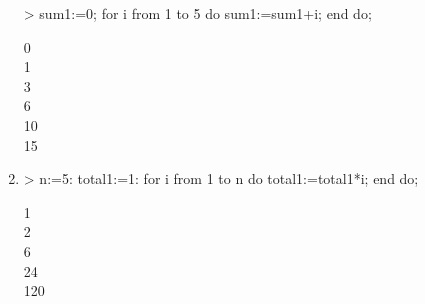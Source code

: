 \begin{enumerate}
\begin{MapleInput}
> sum1:=0; for i from 1 to 5 do 
    sum1:=sum1+i; 
  end do;
\end{MapleInput}
\begin{MapleOutputGather}
 0 \notag \\
 1 \notag \\
 3 \notag \\
 6 \notag \\
 10 \notag \\
 15 \notag
\end{MapleOutputGather}

\item
\begin{MapleInput}
> n:=5: 
  total1:=1:
  for i from 1 to n do 
    total1:=total1*i; 
  end do;
\end{MapleInput}
\begin{MapleOutputGather}
 1 \notag \\
 2 \notag \\
 6 \notag \\
 24 \notag \\
120 \notag
\end{MapleOutputGather}
\end{enumerate}